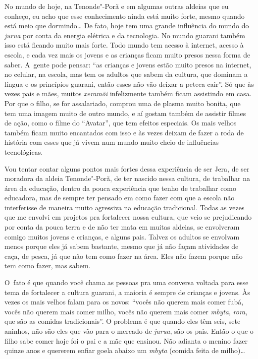 No mundo de hoje, na Tenonde"-Porã e em algumas outras aldeias que eu
conheço, eu acho que esse conhecimento ainda está muito forte, mesmo
quando está meio que dormindo\ldots{} De fato, hoje tem uma grande
influência do mundo do \emph{jurua} por conta da energia elétrica e da
tecnologia. No mundo guarani também isso está ficando muito mais forte.
Todo mundo tem acesso à internet, acesso à escola, e cada vez mais os
jovens e as crianças ficam muito presos nessa forma de saber. A~gente
pode pensar: ``as crianças e jovens estão muito presos na internet, no
celular, na escola, mas tem os adultos que sabem da cultura, que
dominam a língua e os princípios guarani, então esses não vão deixar a
peteca cair''. Só que às vezes pais e mães, muitos \emph{xeramõi} infelizmente
também ficam assistindo  em casa. Por que o filho, se for
assalariado, comprou uma  de plasma muito bonita, que tem uma imagem
muito de outro mundo, e aí gostam também de assistir filmes de ação,
como o filme do ``Avatar'', que tem efeitos especiais. Os mais velhos
também ficam muito encantados com isso e às vezes deixam de fazer a
roda de história com esses que já vivem num mundo muito cheio de
influências tecnológicas. 

Vou tentar contar alguns pontos mais fortes dessa experiência de ser
Jera, de ser moradora da aldeia Tenonde"-Porã, de ter nascido nessa
cultura, de trabalhar na área da educação, dentro da pouca experiência
que tenho de trabalhar como educadora, mas de sempre ter pensado em como
fazer com que a escola não interferisse de maneira muito agressiva na
educação tradicional. Todas as vezes que me envolvi em projetos pra
fortalecer nossa cultura, que veio se prejudicando por conta da pouca
terra e de não ter mata em muitas aldeias, se envolveram comigo muitos
jovens e crianças, e alguns pais. Talvez os adultos se envolvam menos
porque eles já sabem bastante, mesmo que já não façam atividades de
caça, de pesca, já que não tem como fazer na área. Eles não fazem
porque não tem como fazer, mas sabem.

O~fato é que quando você chama as pessoas pra uma conversa voltada para
esse tema de fortalecer a cultura guarani, a maioria é sempre de
crianças e jovens. Às vezes os mais velhos falam para os novos: ``vocês
não querem mais comer fubá, vocês não querem mais comer milho, vocês
não querem mais comer \emph{mbyta}, \emph{rora}, que são as comidas tradicionais''. O
problema é que quando eles têm seis, sete aninhos, não são eles que vão
para o mercado de \emph{jurua}, são os pais. Então o que o filho sabe comer
hoje foi o pai e a mãe que ensinou. Não adianta o menino fazer quinze
anos e quererem enfiar goela abaixo um \emph{mbyta} (comida feita de milho)\ldots{}

